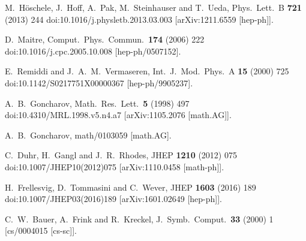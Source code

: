 \documentclass[12pt]{article}
\begin{document}
\begin{thebibliography}{99}
  M.~Höschele, J.~Hoff, A.~Pak, M.~Steinhauser and T.~Ueda,
  Phys.\ Lett.\ B {\bf 721} (2013) 244
  doi:10.1016/j.physletb.2013.03.003
  [arXiv:1211.6559 [hep-ph]].
  
  D.~Maitre,
  Comput.\ Phys.\ Commun.\  {\bf 174} (2006) 222
  doi:10.1016/j.cpc.2005.10.008
  [hep-ph/0507152].
  
  E.~Remiddi and J.~A.~M.~Vermaseren,
  Int.\ J.\ Mod.\ Phys.\ A {\bf 15} (2000) 725
  doi:10.1142/S0217751X00000367
  [hep-ph/9905237].
  
  A.~B.~Goncharov,
  Math.\ Res.\ Lett.\  {\bf 5} (1998) 497
  doi:10.4310/MRL.1998.v5.n4.a7
  [arXiv:1105.2076 [math.AG]].
  
  A.~B.~Goncharov,
  math/0103059 [math.AG].
  
  C.~Duhr, H.~Gangl and J.~R.~Rhodes,
  JHEP {\bf 1210} (2012) 075
  doi:10.1007/JHEP10(2012)075
  [arXiv:1110.0458 [math-ph]].
  
  H.~Frellesvig, D.~Tommasini and C.~Wever,
  JHEP {\bf 1603} (2016) 189
  doi:10.1007/JHEP03(2016)189
  [arXiv:1601.02649 [hep-ph]].
  
  C.~W.~Bauer, A.~Frink and R.~Kreckel,
  J.\ Symb.\ Comput.\  {\bf 33} (2000) 1
  [cs/0004015 [cs-sc]].

\end{thebibliography}
\end{document}
